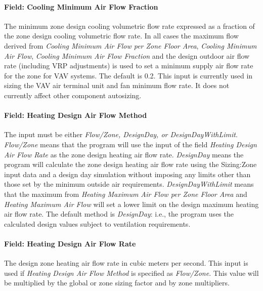 \paragraph{Field: Cooling Minimum Air Flow Fraction}\label{field-cooling-minimum-air-flow-fraction}

The minimum zone design cooling volumetric flow rate expressed as a fraction of the zone design cooling volumetric flow rate.  In all cases the maximum flow derived from \emph{Cooling Minimum Air Flow per Zone Floor Area}, \emph{Cooling Minimum Air Flow}, \emph{Cooling Minimum Air Flow Fraction} and the design outdoor air flow rate (including VRP adjustments) is used to set a minimum supply air flow rate for the zone for VAV systems. The default is 0.2. This input is currently used in sizing the VAV air terminal unit and fan minimum flow rate. It does not currently affect other component autosizing.

\paragraph{Field: Heating Design Air Flow Method}\label{field-heating-design-air-flow-method}

The input must be either \emph{Flow/Zone, DesignDay, or DesignDayWithLimit}. \emph{Flow/Zone} means that the program will use the input of the field \emph{Heating Design Air Flow Rate} as the zone design heating air flow rate. \emph{DesignDay} means the program will calculate the zone design heating air flow rate using the Sizing:Zone input data and a design day simulation without imposing any limits other than those set by the minimum outside air requirements. \emph{DesignDayWithLimit} means that the maximum from \emph{Heating Maximum Air Flow per Zone Floor Area} and \emph{Heating Maximum Air Flow} will set a lower limit on the design maximum heating air flow rate. The default method is \emph{DesignDay}: i.e., the program uses the calculated design values subject to ventilation requirements.

\paragraph{Field: Heating Design Air Flow Rate}\label{field-heating-design-air-flow-rate}

The design zone heating air flow rate in cubic meters per second. This input is used if \emph{Heating Design Air Flow Method} is specified as \emph{Flow/Zone}. This value will be multiplied by the global or zone sizing factor and by zone multipliers.

